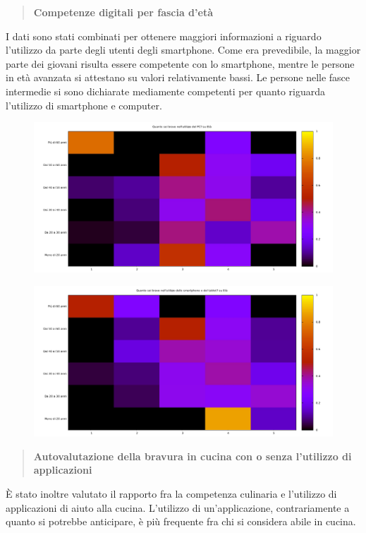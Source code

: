 \begin{quote}
	\textbf{Competenze digitali per fascia d'età}
\end{quote}
I dati sono stati combinati per ottenere maggiori informazioni a riguardo
l'utilizzo da parte degli utenti degli smartphone. Come era prevedibile,
la maggior parte dei giovani risulta essere competente con lo smartphone,
mentre le persone in età avanzata si attestano su valori relativamente
bassi. Le persone nelle fasce intermedie si sono dichiarate mediamente competenti
per quanto riguarda l'utilizzo di smartphone e computer.
\begin{figure}[H]
\centering
	\includegraphics[width=\textwidth]{img/heatmap_pc_eta}
\end{figure}
\begin{figure}[H]
	\includegraphics[width=\textwidth]{img/heatmap_smartphone_eta}
\end{figure}


\begin{quote}
	\textbf{Autovalutazione della bravura in cucina con o senza l'utilizzo
	di applicazioni}
\end{quote}

È stato inoltre valutato il rapporto fra la competenza culinaria e l'utilizzo di applicazioni 
di aiuto alla cucina. L'utilizzo di un'applicazione, contrariamente a quanto si potrebbe
anticipare, è più frequente fra chi si considera abile in cucina.

